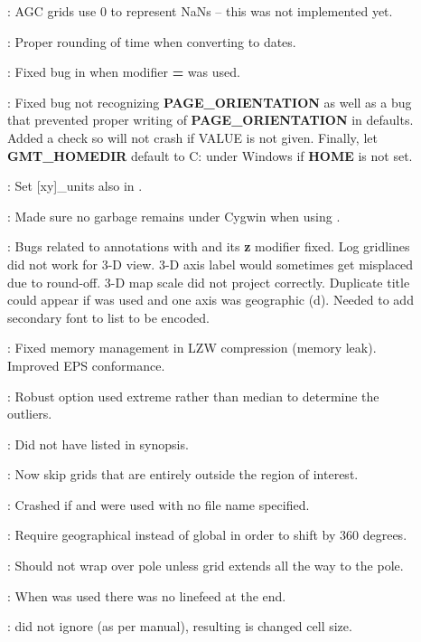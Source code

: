 \begin{description}
\item []: AGC grids use 0 to represent NaNs -- this was not implemented yet.
\item []: Proper rounding of time when converting to dates.
\item []: Fixed bug in  when modifier {\bf =} was used.
\item []: Fixed bug not recognizing {\bf PAGE\_ORIENTATION} as well as a bug that
prevented proper writing of {\bf PAGE\_ORIENTATION} in defaults.  Added a check so 
will not crash if VALUE is not given.  Finally, let {\bf GMT\_HOMEDIR} default to C: under Windows
if {\bf HOME} is not set.
\item []: Set [xy]\_units also in .
\item []: Made sure no garbage remains under Cygwin when using .
\item []: Bugs related to annotations with  and its {\bf z} modifier fixed.
Log gridlines did not work for 3-D view.  3-D axis label would sometimes get misplaced due to round-off.
3-D map scale did not project correctly.  Duplicate title could appear if  was used and one axis was geographic (d).
Needed to add secondary font to list to be encoded.
\item []: Fixed memory management in LZW compression (memory leak).  Improved EPS conformance.
\item []: Robust option used extreme rather than median to determine the outliers.
\item []: Did not have  listed in synopsis.
\item []: Now skip grids that are entirely outside the region of interest.
\item []: Crashed if  and  were used with no file name specified.
\item []: Require geographical instead of global in order to shift by 360 degrees.
\item []: Should not wrap over pole unless grid extends all the way to the pole.
\item []: When  was used there was no linefeed at the end.
\item []:  did not ignore  (as per manual), resulting is changed cell size.

\end{description}
